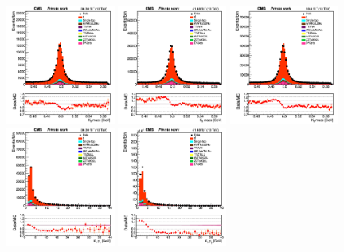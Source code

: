 \documentclass{cernatlasnote}
\begin{document}
  \begin{figure}[htp]
\centering
 \includegraphics[width=0.32\textwidth]{images/emu_channel/2016/16_Range_0pt7_1pt3/Reco_K0_mass__Linear.png}
\includegraphics[width=0.32\textwidth]{images/emu_channel/2017/17_Range_0pt7_1pt3/Reco_K0_mass__Linear.png}
 \includegraphics[width=0.32\textwidth]{images/emu_channel/2018/18_Range_0pt7_1pt3/Reco_K0_mass__Linear.png}\\
 \includegraphics[width=0.32\textwidth]{images/emu_channel/2016/16_Range_0pt7_1pt3/Reco_K0_pt__Linear.png}
\includegraphics[width=0.32\textwidth]{images/emu_channel/2017/17_Range_0pt7_1pt3/Reco_K0_pt__Linear.png}

\end{figure}
\end{document}
